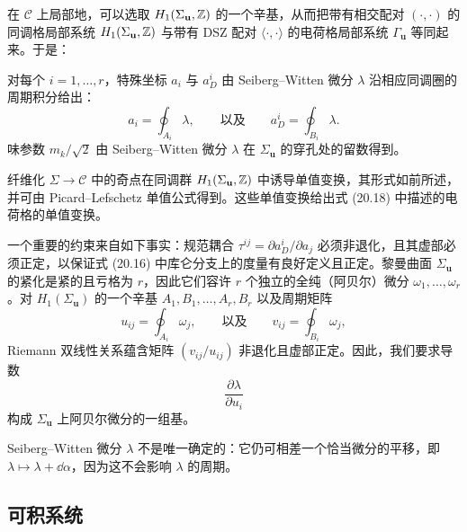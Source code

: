 在 $\mathcal{C}$ 上局部地，可以选取 $H_1(\Sigma_{\mathbf{u}},\mathbb{Z})$ 的一个辛基，从而把带有相交配对 $(\cdot,\cdot)$ 的同调格局部系统 $H_1(\Sigma_{\mathbf{u}},\mathbb{Z})$ 与带有 DSZ 配对 $\langle\cdot,\cdot\rangle$ 的电荷格局部系统 $\Gamma_{\mathbf{u}}$ 等同起来。于是：

\begin{proposition}[20.32]
对每个 $i=1,\dots,r$，特殊坐标 $a_i$ 与 $a_D^i$ 由 Seiberg–Witten 微分 $\lambda$ 沿相应同调圈的周期积分给出：
\[
a_i=\oint_{A_i}\lambda,\qquad\text{以及}\qquad a_D^i=\oint_{B_i}\lambda .
\]
味参数 $m_k/\sqrt{2}$ 由 Seiberg–Witten 微分 $\lambda$ 在 $\Sigma_{\mathbf{u}}$ 的穿孔处的留数得到。
\end{proposition}

纤维化 $\Sigma\to\mathcal{C}$ 中的奇点在同调群 $H_1(\Sigma_{\mathbf{u}},\mathbb{Z})$ 中诱导单值变换，其形式如前所述，并可由 Picard–Lefschetz 单值公式得到。这些单值变换给出式 (20.18) 中描述的电荷格的单值变换。

一个重要的约束来自如下事实：规范耦合 $\tau^{ij}=\partial a_D^i/\partial a_j$ 必须非退化，且其虚部必须正定，以保证式 (20.16) 中库仑分支上的度量有良好定义且正定。黎曼曲面 $\Sigma_{\mathbf{u}}$ 的紧化是紧的且亏格为 $r$，因此它们容许 $r$ 个独立的全纯（阿贝尔）微分 $\omega_1,\dots,\omega_r$。对 $H_1(\Sigma_{\mathbf{u}})$ 的一个辛基 $A_1,B_1,\dots,A_r,B_r$ 以及周期矩阵
\[
u_{ij}=\oint_{A_i}\omega_j,\qquad\text{以及}\qquad v_{ij}=\oint_{B_i}\omega_j,
\]
Riemann 双线性关系蕴含矩阵 $(v_{ij}/u_{ij})$ 非退化且虚部正定。因此，我们要求导数
\[
\frac{\partial\lambda}{\partial u_i}
\]
构成 $\Sigma_{\mathbf{u}}$ 上阿贝尔微分的一组基。

\begin{remark}[20.33]
Seiberg–Witten 微分 $\lambda$ 不是唯一确定的：它仍可相差一个恰当微分的平移，即 $\lambda\mapsto\lambda+\dd\alpha$，因为这不会影响 $\lambda$ 的周期。
\end{remark}

\subsection{可积系统}

